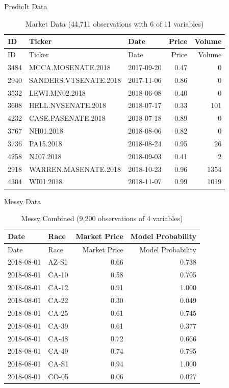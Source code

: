 \documentclass[ignorenonframetext,]{beamer}
\begin{document}
\begin{frame}{PredicIt Data}
\protect\hypertarget{predicit-data}{}

\begin{longtable}[]{@{}lllrr@{}}
\caption{Market Data (44,711 observations with 6 of 11
variables)}\tabularnewline
\toprule
ID & Ticker & Date & Price & Volume\tabularnewline
\midrule
\endfirsthead
\toprule
ID & Ticker & Date & Price & Volume\tabularnewline
\midrule
\endhead
3484 & MCCA.MOSENATE.2018 & 2017-09-20 & 0.47 & 0\tabularnewline
2940 & SANDERS.VTSENATE.2018 & 2017-11-06 & 0.86 & 0\tabularnewline
3532 & LEWI.MN02.2018 & 2018-06-08 & 0.40 & 0\tabularnewline
3608 & HELL.NVSENATE.2018 & 2018-07-17 & 0.33 & 101\tabularnewline
4232 & CASE.PASENATE.2018 & 2018-07-18 & 0.89 & 0\tabularnewline
3767 & NH01.2018 & 2018-08-06 & 0.82 & 0\tabularnewline
3736 & PA15.2018 & 2018-08-24 & 0.95 & 26\tabularnewline
4258 & NJ07.2018 & 2018-09-03 & 0.41 & 2\tabularnewline
2918 & WARREN.MASENATE.2018 & 2018-10-23 & 0.96 & 1354\tabularnewline
4304 & WI01.2018 & 2018-11-07 & 0.99 & 1019\tabularnewline
\bottomrule
\end{longtable}

\end{frame}

\begin{frame}{Messy Data}
\protect\hypertarget{messy-data}{}

\begin{longtable}[]{@{}llrr@{}}
\caption{Messy Combined (9,200 observations of 4
variables)}\tabularnewline
\toprule
Date & Race & Market Price & Model Probability\tabularnewline
\midrule
\endfirsthead
\toprule
Date & Race & Market Price & Model Probability\tabularnewline
\midrule
\endhead
2018-08-01 & AZ-S1 & 0.66 & 0.738\tabularnewline
2018-08-01 & CA-10 & 0.58 & 0.705\tabularnewline
2018-08-01 & CA-12 & 0.91 & 1.000\tabularnewline
2018-08-01 & CA-22 & 0.30 & 0.049\tabularnewline
2018-08-01 & CA-25 & 0.61 & 0.745\tabularnewline
2018-08-01 & CA-39 & 0.61 & 0.377\tabularnewline
2018-08-01 & CA-48 & 0.72 & 0.666\tabularnewline
2018-08-01 & CA-49 & 0.74 & 0.795\tabularnewline
2018-08-01 & CA-S1 & 0.94 & 1.000\tabularnewline
2018-08-01 & CO-05 & 0.06 & 0.027\tabularnewline
\bottomrule
\end{longtable}

\end{frame}
\end{document}
